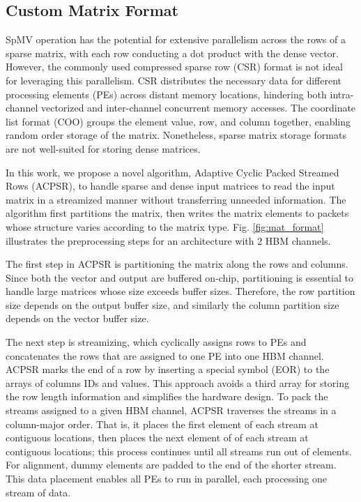 \documentclass[manuscript,screen,review]{acmart}
\begin{document}
\subsection{Custom Matrix Format}

SpMV operation has the potential for extensive parallelism across the rows of a sparse matrix, with each row conducting a dot product with the dense vector. However, the commonly used compressed sparse row (CSR) format is not ideal for leveraging this parallelism. CSR distributes the necessary data for different processing elements (PEs) across distant memory locations, hindering both intra-channel vectorized and inter-channel concurrent memory accesses. The coordinate list format (COO) groups the element value, row, and column together, enabling random order storage of the matrix. Nonetheless, sparse matrix storage formats are not well-suited for storing dense matrices.

In this work, we propose a novel algorithm, Adaptive Cyclic Packed Streamed Rows (ACPSR), to handle sparse and dense input matrices to read the input matrix in a streamized manner without transferring unneeded information. The algorithm first partitions the matrix, then writes the matrix elements to packets whose structure varies according to the matrix type. Fig. \ref{fig:mat_format} illustrates the preprocessing steps for an architecture with 2 HBM channels.

The first step in ACPSR is partitioning the matrix along the rows and columns. Since both the vector and output are buffered on-chip, partitioning is essential to handle large matrices whose size exceeds buffer sizes. Therefore, the row partition size depends on the output buffer size, and similarly the column partition size depends on the vector buffer size.   

The next step is streamizing, which cyclically assigns rows to PEs and concatenates the rows that are assigned to one PE into one HBM channel. ACPSR marks the end of a row by inserting a special symbol (EOR) to the arrays of columns IDs and values. This approach avoids a third array for storing the row length information and simplifies the hardware design. To pack the streams assigned to a given HBM channel, ACPSR traverses the streams in a column-major order. That is, it places the first element of each stream at contiguous locations, then places the next element of of each stream at contiguous locations; this process continues until all streams run out of elements. For alignment, dummy elements are padded to the end of the shorter stream. This data placement enables all PEs to
run in parallel, each processing one stream of data.
\end{document}
